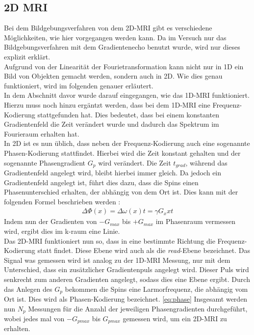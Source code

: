 \subsection{2D MRI}
Bei dem Bildgebungsverfahren von dem 2D-MRI gibt es verschiedene Möglichkeiten, wie hier vorgegangen werden kann. Da im Versuch nur das Bildgebungsverfahren mit dem Gradientenecho benutzt wurde, wird nur dieses explizit erklärt.\\
Aufgrund von der Linearität der Fourietransformation kann nicht nur in 1D ein Bild von Objekten gemacht werden, sondern auch in 2D. Wie dies genau funktioniert, wird im folgenden genauer erläutert.\\
In dem Abschnitt davor wurde darauf eingegangen, wie das 1D-MRI funktioniert. Hierzu muss noch hinzu ergäntzt werden, dass bei dem 1D-MRI eine Frequenz-Kodierung stattgefunden hat. Dies bedeutet, dass bei einem konstanten Gradientenfeld die Zeit verändert wurde und dadurch das Spektrum im Fourieraum erhalten hat. \\
In 2D ist es nun üblich, dass neben der Frequenz-Kodierung auch eine sogenannte Phasen-Kodierung stattfindet. Hierbei wird die Zeit konstant gehalten und der sogenannte Phasengradient $G_p$ wird verändert. Die Zeit $t_{grad}$, während das Gradientenfeld angelegt wird, bleibt hierbei immer gleich. Da jedoch ein Gradientenfeld angelegt ist, führt dies dazu, dass die Spins einen Phasenunterschied erhalten, der abhängig von dem Ort ist. Dies kann mit der folgenden Formel beschrieben werden \cite{Schmidt}:
\begin{align}
    \Delta\Phi(x)= \Delta\omega(x)t=\gamma G_xxt
\end{align}\label{eq:phase}
Indem nun der Gradienten von $-G_{max}$ bis $+G_{max}$ im Phasenraum vermessen wird, ergibt dies im k-raum eine Linie.\\
Das 2D-MRI funktioniert nun so, dass in eine bestimmte Richtung die Frequenz-Kodierung statt findet. Diese Ebene wird auch als die \textit{read}-Ebene bezeichnet. Das Signal was gemessen wird ist analog zu der 1D-MRI Messung, nur mit dem Unterschied, dass ein zusätzlicher Gradientenpuls angelegt wird. Dieser Puls wird senkrecht zum anderen Gradienten angelegt, sodass dies eine Ebene ergibt. Durch das Anlegen des $G_p$ bekommen die Spins eine Larmorfrequenz, die abhängig vom Ort ist. Dies wird als Phasen-Kodierung bezeichnet. \ref{eq:phase}
Insgesamt werden nun $N_p$ Messungen für die Anzahl der jeweiligen Phasengradienten durchgeführt, wobei jedes mal von $-G_{pmax}$ bis $G_{pmax}$ gemessen wird, um ein 2D-MRI zu erhalten.
